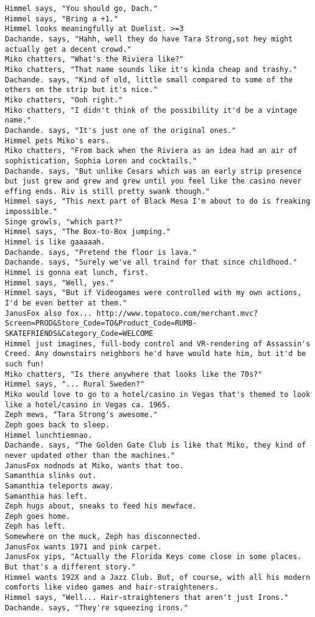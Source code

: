 \begin{verbatim}
Himmel says, "You should go, Dach."
Himmel says, "Bring a +1."
Himmel looks meaningfully at Duelist. >=3
Dachande. says, "Hahh, well they do have Tara Strong,sot hey might actually get a decent crowd."
Miko chatters, "What's the Riviera like?"
Miko chatters, "That name sounds like it's kinda cheap and trashy."
Dachande. says, "Kind of old, little small compared to some of the others on the strip but it's nice."
Miko chatters, "Ooh right."
Miko chatters, "I didn't think of the possibility it'd be a vintage name."
Dachande. says, "It's just one of the original ones."
Himmel pets Miko's ears.
Miko chatters, "From back when the Riviera as an idea had an air of sophistication, Sophia Loren and cocktails."
Dachande. says, "But unlike Cesars which was an early strip presence but just grew and grew and grew until you feel like the casino never effing ends. Riv is still pretty swank though."
Himmel says, "This next part of Black Mesa I'm about to do is freaking impossible."
Singe growls, "which part?"
Himmel says, "The Box-to-Box jumping."
Himmel is like gaaaaah.
Dachande. says, "Pretend the floor is lava."
Dachande. says, "Surely we've all traind for that since childhood."
Himmel is gonna eat lunch, first.
Himmel says, "Well, yes."
Himmel says, "But if Videogames were controlled with my own actions, I'd be even better at them."
JanusFox also fox... http://www.topatoco.com/merchant.mvc?Screen=PROD&Store_Code=TO&Product_Code=RUMB-SKATEFRIENDS&Category_Code=WELCOME
Himmel just imagines, full-body control and VR-rendering of Assassin's Creed. Any downstairs neighbors he'd have would hate him, but it'd be such fun!
Miko chatters, "Is there anywhere that looks like the 70s?"
Himmel says, "... Rural Sweden?"
Miko would love to go to a hotel/casino in Vegas that's themed to look like a hotel/casino in Vegas ca. 1965.
Zeph mews, "Tara Strong's awesome."
Zeph goes back to sleep.
Himmel lunchtiemnao.
Dachande. says, "The Golden Gate Club is like that Miko, they kind of never updated other than the machines."
JanusFox nodnods at Miko, wants that too.
Samanthia slinks out.
Samanthia teleports away.
Samanthia has left.
Zeph hugs about, sneaks to feed his mewface.
Zeph goes home.
Zeph has left.
Somewhere on the muck, Zeph has disconnected.
JanusFox wants 1971 and pink carpet.
JanusFox yips, "Actually the Florida Keys come close in some places.  But that's a different story."
Himmel wants 192X and a Jazz Club. But, of course, with all his modern comforts like video games and hair-straighteners.
Himmel says, "Well... Hair-straighteners that aren't just Irons."
Dachande. says, "They're squeezing irons."

\end{verbatim}
